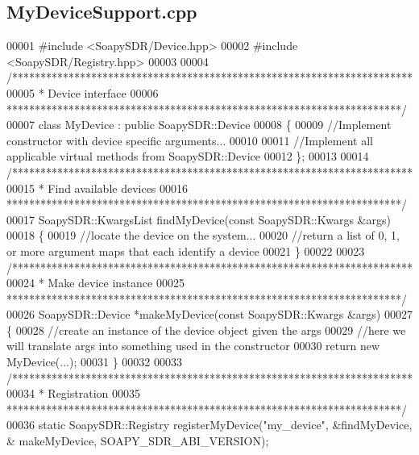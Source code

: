 \subsection{My\+Device\+Support.\+cpp}
\label{MyDeviceSupport_8cpp_source}

\begin{DoxyCode}
00001 \textcolor{preprocessor}{#include <SoapySDR/Device.hpp>}
00002 \textcolor{preprocessor}{#include <SoapySDR/Registry.hpp>}
00003 
00004 \textcolor{comment}{/***********************************************************************}
00005 \textcolor{comment}{ * Device interface}
00006 \textcolor{comment}{ **********************************************************************/}
00007 \textcolor{keyword}{class }MyDevice : \textcolor{keyword}{public} SoapySDR::Device
00008 \{
00009     \textcolor{comment}{//Implement constructor with device specific arguments...}
00010 
00011     \textcolor{comment}{//Implement all applicable virtual methods from SoapySDR::Device}
00012 \};
00013 
00014 \textcolor{comment}{/***********************************************************************}
00015 \textcolor{comment}{ * Find available devices}
00016 \textcolor{comment}{ **********************************************************************/}
00017 SoapySDR::KwargsList findMyDevice(\textcolor{keyword}{const} SoapySDR::Kwargs &args)
00018 \{
00019     \textcolor{comment}{//locate the device on the system...}
00020     \textcolor{comment}{//return a list of 0, 1, or more argument maps that each identify a device}
00021 \}
00022 
00023 \textcolor{comment}{/***********************************************************************}
00024 \textcolor{comment}{ * Make device instance}
00025 \textcolor{comment}{ **********************************************************************/}
00026 SoapySDR::Device *makeMyDevice(\textcolor{keyword}{const} SoapySDR::Kwargs &args)
00027 \{
00028     \textcolor{comment}{//create an instance of the device object given the args}
00029     \textcolor{comment}{//here we will translate args into something used in the constructor}
00030     \textcolor{keywordflow}{return} \textcolor{keyword}{new} MyDevice(...);
00031 \}
00032 
00033 \textcolor{comment}{/***********************************************************************}
00034 \textcolor{comment}{ * Registration}
00035 \textcolor{comment}{ **********************************************************************/}
00036 \textcolor{keyword}{static} SoapySDR::Registry registerMyDevice(\textcolor{stringliteral}{"my\_device"}, &findMyDevice, &
      makeMyDevice, SOAPY_SDR_ABI_VERSION);
\end{DoxyCode}
